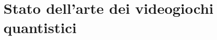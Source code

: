 \documentclass{book}
\theoremstyle{definition}
\theoremstyle{definition}
\theoremstyle{definition}
\theoremstyle{plain}
\theoremstyle{plain}
\theoremstyle{plain}
\theoremstyle{plain}
\begin{document}

\chapter{Stato dell'arte dei videogiochi quantistici} \label{chap:games_today}
\end{document}
